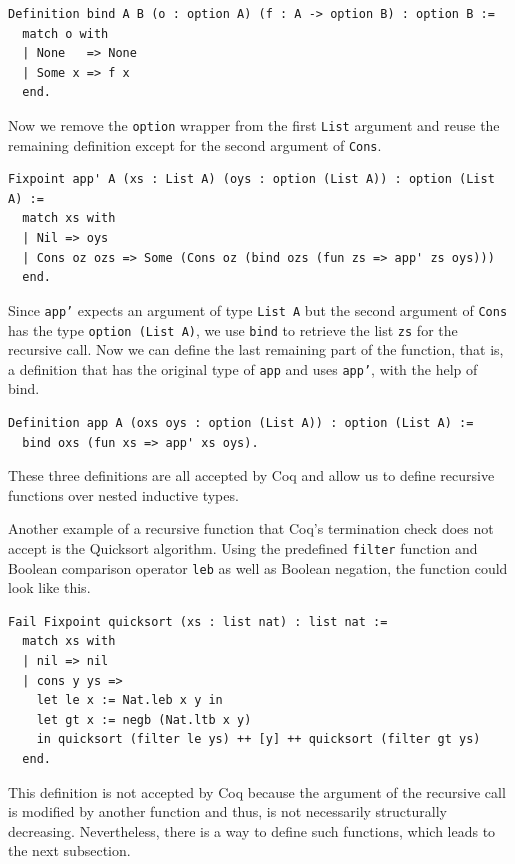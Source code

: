 \documentclass[a4paper, 11pt, fleqn, twoside]{scrreprt}
\newcommand{\cinl}[1]{\texttt{#1}}
\begin{document}
\begin{verbatim}
Definition bind A B (o : option A) (f : A -> option B) : option B :=
  match o with
  | None   => None
  | Some x => f x
  end.
\end{verbatim}

Now we remove the \cinl{option} wrapper from the first \cinl{List} argument and reuse the remaining definition except for the second argument of \cinl{Cons}.

\begin{verbatim}
Fixpoint app' A (xs : List A) (oys : option (List A)) : option (List A) :=
  match xs with
  | Nil => oys
  | Cons oz ozs => Some (Cons oz (bind ozs (fun zs => app' zs oys)))
  end.
\end{verbatim}

Since \cinl{app'} expects an argument of type \cinl{List A} but the second argument of \cinl{Cons} has the type \cinl{option (List A)}, we use \cinl{bind} to retrieve the list \cinl{zs} for the recursive call.
Now we can define the last remaining part of the function, that is, a definition that has the original type of \cinl{app} and uses \cinl{app'}, with the help of bind.

\begin{verbatim}
Definition app A (oxs oys : option (List A)) : option (List A) :=
  bind oxs (fun xs => app' xs oys).
\end{verbatim}

These three definitions are all accepted by Coq and allow us to define recursive functions over nested inductive types.

Another example of a recursive function that Coq's termination check does not accept is the Quicksort algorithm.
Using the predefined \cinl{filter} function and Boolean comparison operator \cinl{leb} as well as Boolean negation, the function could look like this.

\begin{verbatim}
Fail Fixpoint quicksort (xs : list nat) : list nat :=
  match xs with
  | nil => nil
  | cons y ys =>
    let le x := Nat.leb x y in
    let gt x := negb (Nat.ltb x y)
    in quicksort (filter le ys) ++ [y] ++ quicksort (filter gt ys)
  end.
\end{verbatim}

This definition is not accepted by Coq because the argument of the recursive call is modified by another function and thus, is not necessarily structurally decreasing.
Nevertheless, there is a way to define such functions, which leads to the next subsection.
\end{document}
